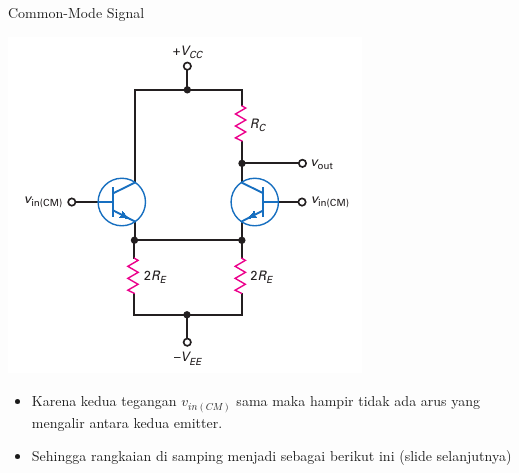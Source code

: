 \documentclass[aspectratio=169]{beamer}
\begin{document}
\begin{frame}{Common-Mode Signal}
	\begin{multicols}{2}
		\begin{center}
			\includegraphics[height=0.7\textheight]{gambar/01.diff-amp/01.equivalent_circuit_commonmode}
		\end{center}
		\columnbreak
		\begin{itemize}
			\item Karena kedua tegangan $ v_{in(CM)} $ sama maka hampir tidak ada arus yang mengalir antara kedua emitter.
			\item Sehingga rangkaian di samping menjadi sebagai berikut ini (slide selanjutnya)
		\end{itemize}
	\end{multicols}
\end{frame}
\end{document}
